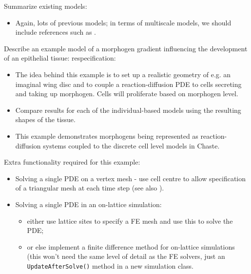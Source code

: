 \documentclass{article}
\begin{document}
\noindent Summarize existing models:
\begin{itemize}
\item Again, lots of previous models; in terms of multiscale models, we should include references such as \citet{Schilling2011Cell}.
\end{itemize}

\noindent Describe an example model of a morphogen gradient influencing the development of an epithelial tissue: respecification:
\begin{itemize}
\item The idea behind this example is to set up a realistic geometry of e.g. an imaginal wing disc and to couple a reaction-diffusion PDE to cells secreting and taking up morphogen. Cells will proliferate based on morphogen level.
\item Compare results for each of the individual-based models using the resulting shapes of the tissue.
\item This example demonstrates morphogens being represented as reaction-diffusion systems coupled to the discrete cell level models in Chaste.
\end{itemize}

\noindent Extra functionality required for this example:
\begin{itemize}
\item Solving a single PDE on a vertex mesh - use cell centre to allow specification of a triangular mesh at each time step (see also \citet{Smith2011Incorporating}).
\item Solving a single PDE in an on-lattice simulation:
\begin{itemize}
\item either use lattice sites to specify a FE mesh and use this to solve the PDE;
\item or else implement a finite difference method for on-lattice simulations (this won't need the same level of detail as the FE solvers, just an \texttt{UpdateAfterSolve()} method in a new simulation class.
\end{itemize}
\end{itemize}
\end{document}
